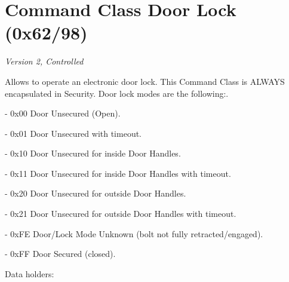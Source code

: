 \section{Command Class Door Lock (0x62/98)}

\textit{Version 2, Controlled}
\newline

Allows to operate an electronic door lock. This Command Class is ALWAYS encapsulated in Security. Door lock modes are the following:. 

- 0x00 Door Unsecured (Open). 

- 0x01 Door Unsecured with timeout. 

- 0x10 Door Unsecured for inside Door Handles. 

- 0x11 Door Unsecured for inside Door Handles with timeout. 

- 0x20 Door Unsecured for outside Door Handles. 

- 0x21 Door Unsecured for outside Door Handles with timeout. 

- 0xFE Door/Lock Mode Unknown (bolt not fully retracted/engaged). 

- 0xFF Door Secured (closed).
\newline

\noindent
Data holders:

